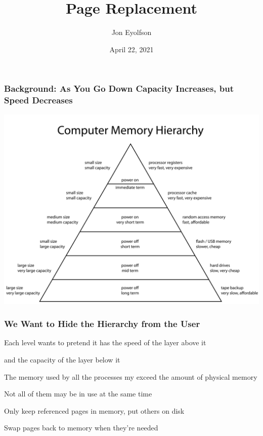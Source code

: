 

\title{Page Replacement}
\author{Jon Eyolfson}
\date{April 22, 2021}



  \begin{frame}
    \titlepage
  \end{frame}

  \begin{frame}
    \frametitle{Background: As You Go Down Capacity Increases, but Speed Decreases}

    \begin{center}
      \includegraphics[scale=0.175]{ComputerMemoryHierarchy.png}
    \end{center}
  \end{frame}

  \begin{frame}
    \frametitle{We Want to Hide the Hierarchy from the User}

    Each level wants to pretend it has the speed of the layer above it

    \hspace{2em} and the capacity of the layer below it

    \vspace{2em}

    The memory used by all the processes my exceed the amount of physical memory

    \hspace{2em} Not all of them may be in use at the same time

    \vspace{2em}

    Only keep referenced pages in memory, put others on disk

    \hspace{2em} Swap pages back to memory when they're needed
  \end{frame}


